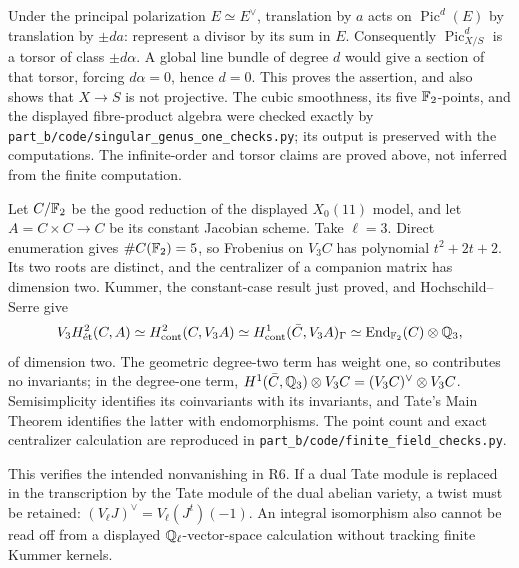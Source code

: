 \begin{example}
Under the principal polarization \(E\simeq E^\vee\), translation
by \(a\) acts on \(\operatorname{Pic}^d(E)\) by translation
by \(\pm da\): represent a divisor by its sum in \(E\).
Consequently \(\operatorname{Pic}^d_{X/S}\) is a torsor of
class \(\pm d\alpha\).  A global line bundle of degree \(d\)
would give a section of that torsor, forcing \(d\alpha=0\),
hence \(d=0\).  This proves the assertion, and also shows that
\(X\to S\) is not projective.  The cubic smoothness, its five
\(\mathbb F_2\)-points, and the displayed fibre-product algebra were
checked exactly by
\texttt{part\_b/code/singular\_genus\_one\_checks.py}; its output
is preserved with the computations.  The infinite-order and torsor
claims are proved above, not inferred from the finite computation.
\end{example}

\begin{example}\label{ex:B-H2-constant}
Let \(C/\mathbb F_2\) be the good reduction of the displayed
\(X_0(11)\) model, and let \(A=C\times C\to C\) be its
constant Jacobian scheme.  Take \(\ell=3\).  Direct enumeration
gives \(\#C(\mathbb F_2)=5\), so Frobenius on \(V_3C\) has
polynomial \(t^2+2t+2\).  Its two roots are distinct, and the
centralizer of a companion matrix has dimension two.  Kummer,
the constant-case result just proved, and Hochschild--Serre give
\[
 V_3H^2_{\mathrm{\acute et}}(C,A)
 \simeq H^2_{\mathrm{cont}}(C,V_3A)
 \simeq H^1_{\mathrm{cont}}(\bar C,V_3A)_\Gamma
 \simeq\operatorname{End}_{\mathbb F_2}(C)\otimes\mathbb Q_3,
\]
of dimension two.  The geometric degree-two term has weight one,
so contributes no invariants; in the degree-one term,
\(H^1(\bar C,\mathbb Q_3)\otimes V_3C=(V_3C)^\vee\otimes V_3C\).
Semisimplicity identifies its coinvariants with its invariants,
and Tate's Main Theorem identifies the latter with endomorphisms.
The point count and exact centralizer calculation are reproduced in
\texttt{part\_b/code/finite\_field\_checks.py}.

This verifies the intended nonvanishing in R6.  If a dual Tate module
is replaced in the transcription by the Tate module of the dual
abelian variety, a twist must be retained:
\((V_\ell J)^\vee=V_\ell(J^t)(-1)\).
An integral isomorphism also cannot be read off from a displayed
\(\mathbb Q_\ell\)-vector-space calculation without tracking finite
Kummer kernels.
\end{example}

